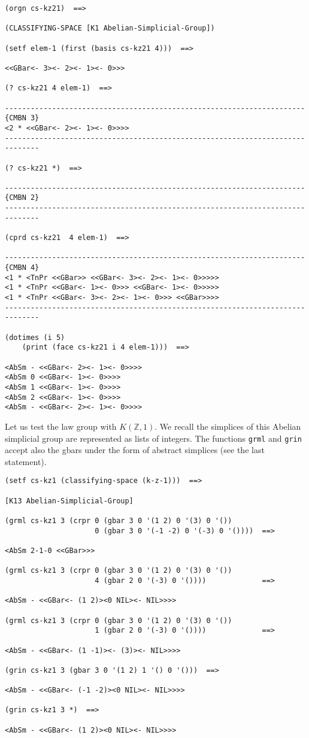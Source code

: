 \newpage
{\footnotesize\begin{verbatim}
(orgn cs-kz21)  ==>

(CLASSIFYING-SPACE [K1 Abelian-Simplicial-Group])

(setf elem-1 (first (basis cs-kz21 4)))  ==>

<<GBar<- 3><- 2><- 1><- 0>>>

(? cs-kz21 4 elem-1)  ==>

----------------------------------------------------------------------{CMBN 3}
<2 * <<GBar<- 2><- 1><- 0>>>>
------------------------------------------------------------------------------

(? cs-kz21 *)  ==>

----------------------------------------------------------------------{CMBN 2}
------------------------------------------------------------------------------

(cprd cs-kz21  4 elem-1)  ==>

----------------------------------------------------------------------{CMBN 4}
<1 * <TnPr <<GBar>> <<GBar<- 3><- 2><- 1><- 0>>>>>
<1 * <TnPr <<GBar<- 1><- 0>>> <<GBar<- 1><- 0>>>>>
<1 * <TnPr <<GBar<- 3><- 2><- 1><- 0>>> <<GBar>>>>
------------------------------------------------------------------------------

(dotimes (i 5)
    (print (face cs-kz21 i 4 elem-1)))  ==>

<AbSm - <<GBar<- 2><- 1><- 0>>>>
<AbSm 0 <<GBar<- 1><- 0>>>>
<AbSm 1 <<GBar<- 1><- 0>>>>
<AbSm 2 <<GBar<- 1><- 0>>>>
<AbSm - <<GBar<- 2><- 1><- 0>>>>
\end{verbatim}}
Let us test the law group with $K(\mathbb{Z}, 1)$. We recall the simplices
of  this Abelian simplicial group are represented as lists of integers.
The functions {\tt grml} and {\tt grin} accept also the gbars under the form
of abstract simplices (see the last statement).
{\footnotesize\begin{verbatim}
(setf cs-kz1 (classifying-space (k-z-1)))  ==>

[K13 Abelian-Simplicial-Group]

(grml cs-kz1 3 (crpr 0 (gbar 3 0 '(1 2) 0 '(3) 0 '())
                     0 (gbar 3 0 '(-1 -2) 0 '(-3) 0 '())))  ==>

<AbSm 2-1-0 <<GBar>>>

(grml cs-kz1 3 (crpr 0 (gbar 3 0 '(1 2) 0 '(3) 0 '())
                     4 (gbar 2 0 '(-3) 0 '())))             ==>

<AbSm - <<GBar<- (1 2)><0 NIL><- NIL>>>>

(grml cs-kz1 3 (crpr 0 (gbar 3 0 '(1 2) 0 '(3) 0 '())
                     1 (gbar 2 0 '(-3) 0 '())))             ==>

<AbSm - <<GBar<- (1 -1)><- (3)><- NIL>>>>

(grin cs-kz1 3 (gbar 3 0 '(1 2) 1 '() 0 '()))  ==>

<AbSm - <<GBar<- (-1 -2)><0 NIL><- NIL>>>>

(grin cs-kz1 3 *)  ==>

<AbSm - <<GBar<- (1 2)><0 NIL><- NIL>>>>
\end{verbatim}}
